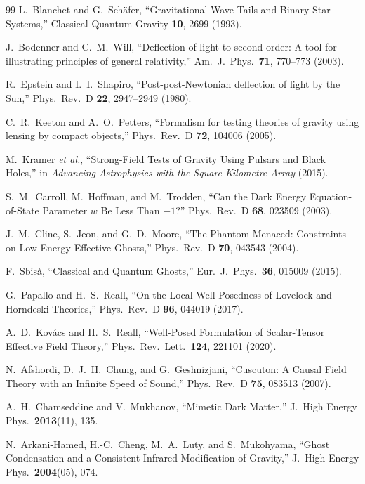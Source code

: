 \begin{thebibliography}{99}
L.~Blanchet and G.~Sch\"afer,
``Gravitational Wave Tails and Binary Star Systems,''
Classical Quantum Gravity \textbf{10}, 2699 (1993).

J.~Bodenner and C.~M.~Will,
``Deflection of light to second order: A tool for illustrating principles of general relativity,''
Am.\ J.\ Phys.\ \textbf{71}, 770--773 (2003).

R.~Epstein and I.~I.~Shapiro,
``Post-post-Newtonian deflection of light by the Sun,''
Phys.\ Rev.\ D \textbf{22}, 2947--2949 (1980).

C.~R.~Keeton and A.~O.~Petters,
``Formalism for testing theories of gravity using lensing by compact objects,''
Phys.\ Rev.\ D \textbf{72}, 104006 (2005).

M.~Kramer \textit{et al.},
``Strong-Field Tests of Gravity Using Pulsars and Black Holes,''
in \textit{Advancing Astrophysics with the Square Kilometre Array} (2015).

S.~M.~Carroll, M.~Hoffman, and M.~Trodden,
``Can the Dark Energy Equation-of-State Parameter $w$ Be Less Than $-1$?''
Phys.\ Rev.\ D \textbf{68}, 023509 (2003).

J.~M.~Cline, S.~Jeon, and G.~D.~Moore,
``The Phantom Menaced: Constraints on Low-Energy Effective Ghosts,''
Phys.\ Rev.\ D \textbf{70}, 043543 (2004).

F.~Sbis\`a,
``Classical and Quantum Ghosts,''
Eur.\ J.\ Phys.\ \textbf{36}, 015009 (2015).

G.~Papallo and H.~S.~Reall,
``On the Local Well-Posedness of Lovelock and Horndeski Theories,''
Phys.\ Rev.\ D \textbf{96}, 044019 (2017).

A.~D.~Kov\'acs and H.~S.~Reall,
``Well-Posed Formulation of Scalar-Tensor Effective Field Theory,''
Phys.\ Rev.\ Lett.\ \textbf{124}, 221101 (2020).

N.~Afshordi, D.~J.~H.~Chung, and G.~Geshnizjani,
``Cuscuton: A Causal Field Theory with an Infinite Speed of Sound,''
Phys.\ Rev.\ D \textbf{75}, 083513 (2007).

A.~H.~Chamseddine and V.~Mukhanov,
``Mimetic Dark Matter,''
J.\ High Energy Phys.\ \textbf{2013}(11), 135.

N.~Arkani-Hamed, H.-C.~Cheng, M.~A.~Luty, and S.~Mukohyama,
``Ghost Condensation and a Consistent Infrared Modification of Gravity,''
J.\ High Energy Phys.\ \textbf{2004}(05), 074.


\end{thebibliography}
